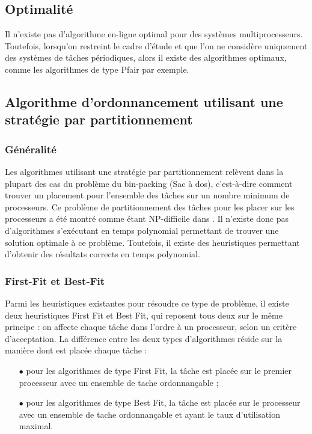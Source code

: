 \subsection{Optimalité}
\vspace{-1cm}
\begin{theoreme}[\cite{HL92}]
Il n'existe pas d'algorithme en-ligne optimal pour des systèmes multiprocesseurs. Toutefois, lorsqu'on restreint le cadre d'étude et que l'on ne considère uniquement des systèmes de tâches périodiques, alors il existe des algorithmes optimaux, comme les algorithmes de type Pfair par exemple.
\end{theoreme}

\subsection{Algorithme d'ordonnancement utilisant une stratégie par partitionnement}
\subsubsection{Généralité}
\vspace{-1cm}
Les algorithmes utilisant une stratégie par partitionnement relèvent dans la plupart des cas du problème du bin-packing (Sac à dos), c'est-à-dire comment trouver un placement pour l'ensemble des tâches sur un nombre minimum de processeurs.
Ce problème de partitionnement des tâches pour les placer sur les processeurs a été montré comme étant NP-difficile dans \cite{LW82}. Il n'existe donc pas d'algorithmes s'exécutant en temps polynomial permettant de trouver une solution optimale à ce problème. Toutefois, il existe des heuristiques permettant d'obtenir des résultats corrects en temps polynomial.
\subsubsection{First-Fit et Best-Fit}
\vspace{-1cm}
Parmi les heuristiques existantes pour résoudre ce type de problème, il existe deux heuristiques First Fit et Best Fit, qui reposent tous deux sur le même principe : on affecte chaque tâche dans l'ordre à un processeur, selon un critère d'acceptation.
La différence entre les deux types d'algorithmes réside sur la manière dont est placée chaque tâche :
\begin{itemize}
\item[$\bullet$] pour les algorithmes de type First Fit, la tâche est placée sur le premier processeur avec un ensemble de tache ordonnançable ;
\item[$\bullet$] pour les algorithmes de type Best Fit, la tâche est placée sur le processeur avec un ensemble de tache ordonnançable et ayant le taux d'utilisation maximal.
\end{itemize}

